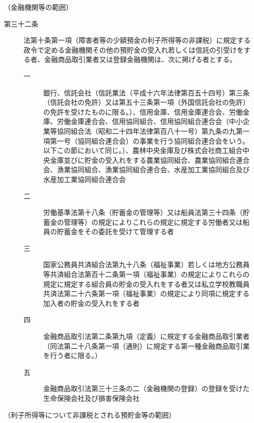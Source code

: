 \documentclass[twocolumn,a4j,10pt]{ltjtarticle}
\begin{document}
\noindent\hspace{10pt}（金融機関等の範囲）
\begin{description}
\item[第三十二条]法第十条第一項（障害者等の少額預金の利子所得等の非課税）に規定する政令で定める金融機関その他の預貯金の受入れ若しくは信託の引受けをする者、金融商品取引業者又は登録金融機関は、次に掲げる者とする。
\begin{description}
\item[一]銀行、信託会社（信託業法（平成十六年法律第百五十四号）第三条（信託会社の免許）又は第五十三条第一項（外国信託会社の免許）の免許を受けたものに限る。）、信用金庫、信用金庫連合会、労働金庫、労働金庫連合会、信用協同組合、信用協同組合連合会（中小企業等協同組合法（昭和二十四年法律第百八十一号）第九条の九第一項第一号（協同組合連合会）の事業を行う協同組合連合会をいう。以下この節において同じ。）、農林中央金庫及び株式会社商工組合中央金庫並びに貯金の受入れをする農業協同組合、農業協同組合連合会、漁業協同組合、漁業協同組合連合会、水産加工業協同組合及び水産加工業協同組合連合会
\item[二]労働基準法第十八条（貯蓄金の管理等）又は船員法第三十四条（貯蓄金の管理等）の規定によりこれらの規定に規定する労働者又は船員の貯蓄金をその委託を受けて管理する者
\item[三]国家公務員共済組合法第九十八条（福祉事業）若しくは地方公務員等共済組合法第百十二条第一項（福祉事業）の規定によりこれらの規定に規定する組合員の貯金の受入れをする者又は私立学校教職員共済法第二十六条第一項（福祉事業）の規定により同項に規定する加入者の貯金の受入れをする者
\item[四]金融商品取引法第二条第九項（定義）に規定する金融商品取引業者（同法第二十八条第一項（通則）に規定する第一種金融商品取引業を行う者に限る。）
\item[五]金融商品取引法第三十三条の二（金融機関の登録）の登録を受けた生命保険会社及び損害保険会社
\end{description}
\end{description}
\noindent\hspace{10pt}（利子所得等について非課税とされる預貯金等の範囲）
\end{document}
